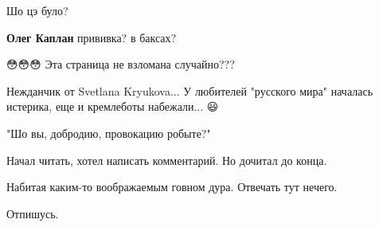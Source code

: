 \begin{itemize}
 
Шо цэ було? 🤔

\begin{itemize}
 
\textbf{Олег Каплан} прививка? в баксах?
\end{itemize}

 
😳😳😳 Эта страница не взломана случайно???

 
Нежданчик от Svetlana Kryukova... У любителей "русского мира" началась истерика, еще и кремлеботы набежали... 😃

 
"Шо вы, добродию, провокацию робыте?"

 

Начал читать, хотел написать комментарий. Но дочитал до конца.

Набитая каким-то воображаемым говном дура. Отвечать тут нечего.

Отпишусь.


\end{itemize}
